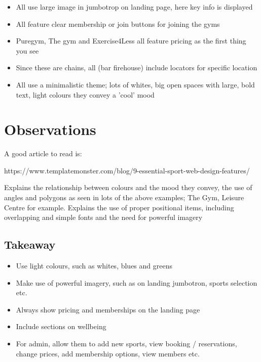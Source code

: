 \documentclass[12pt,a4paper]{article}
\begin{document}
\begin{itemize}
	\item All use large image in jumbotrop on landing page, here key info is displayed
	
	\item All feature clear membership or join buttons for joining the gyms
	
	\item Puregym, The gym and Exercise4Less all feature pricing as the first thing you see	
	
	\item Since these are chains, all (bar firehouse) include locators for specific location
	
	\item All use a minimalistic theme; lots of whites, big open spaces with large, bold text, light colours they convey a 'cool' mood
\end{itemize}




\section{Observations}

A good article to read is:

\begin{center}	
	https://www.templatemonster.com/blog/9-essential-sport-web-design-features/
\end{center}

Explains the relationship between colours and the mood they convey, the use of angles and polygons as seen in lots of the above examples; The Gym, Leisure Centre for example. Explains the use of proper positional items, including overlapping and simple fonts and the need for powerful imagery 

\subsection{Takeaway}

\begin{itemize}
	\item Use light colours, such as whites, blues and greens
	
	\item Make use of powerful imagery, such as on landing jumbotron, sports selection etc.
	
	\item Always show pricing and memberships on the landing page
	
	\item Include sections on wellbeing
	
	\item For admin, allow them to add new sports, view booking / reservations, change prices, add membership options, view members etc.
\end{itemize}
\end{document}
